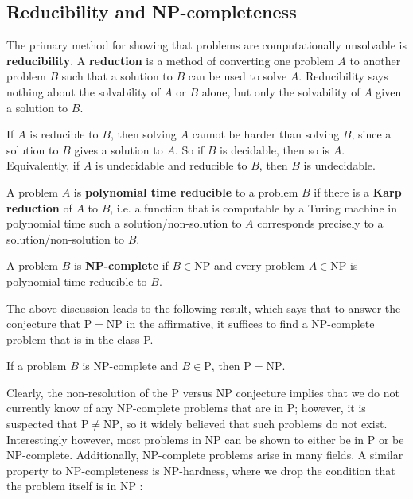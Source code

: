 \subsection{Reducibility and NP-completeness}

The primary method for showing that problems are computationally unsolvable is \textbf{reducibility}. A \textbf{reduction} is a method of converting one problem $A$ to another problem $B$ such that a solution to $B$ can be used to solve $A$. Reducibility says nothing about the solvability of $A$ or $B$ alone, but only the solvability of $A$ given a solution to $B$. 

If $A$ is reducible to $B$, then solving $A$ cannot be harder than solving $B$, since a solution to $B$ gives a solution to $A$. So if $B$ is decidable, then so is $A$. Equivalently, if $A$ is undecidable and reducible to $B$, then $B$ is undecidable.

\begin{definition}\label{def:Karp_reduction}
  A problem $A$ is \textbf{polynomial time reducible} to a problem $B$ if there is a \textbf{Karp reduction} of $A$ to $B$, i.e. a function that is computable by a Turing machine in polynomial time such a solution/non-solution to $A$ corresponds precisely to a solution/non-solution to $B$.
\end{definition}

\begin{definition}\label{def:NP_complete}
  A problem $B$ is \textbf{NP-complete} if $B \in \mathrm{NP}$ and every problem $A \in \mathrm{NP}$ is polynomial time reducible to $B$.
\end{definition}

The above discussion leads to the following result, which says that to answer the conjecture that $\mathrm{P} = \mathrm{NP}$ in the affirmative, it suffices to find a NP-complete problem that is in the class P.

\begin{theorem}\label{thm:NP_complete_P_vs_NP}
  If a problem $B$ is NP-complete and $B \in \mathrm{P}$, then $\mathrm{P} = \mathrm{NP}$. \qedhere
\end{theorem}

Clearly, the non-resolution of the P versus NP conjecture implies that we do not currently know of any NP-complete problems that are in P; however, it is suspected that $\mathrm{P} \neq \mathrm{NP}$, so it widely believed that such problems do not exist. Interestingly however,  most problems in NP can be shown to either be in P or be NP-complete. Additionally, NP-complete problems arise in many fields. A similar property to NP-completeness is NP-hardness, where we drop the condition that the problem itself is in NP :

